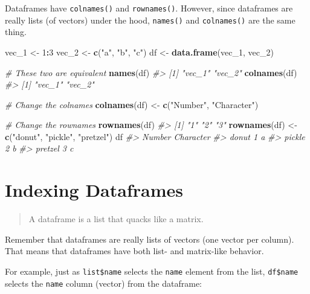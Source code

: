 \documentclass[
]{book}
\newenvironment{Shaded}{\begin{snugshade}}{\end{snugshade}}
\newcommand{\CommentTok}[1]{\textcolor[rgb]{0.56,0.35,0.01}{\textit{#1}}}
\newcommand{\DecValTok}[1]{\textcolor[rgb]{0.00,0.00,0.81}{#1}}
\newcommand{\KeywordTok}[1]{\textcolor[rgb]{0.13,0.29,0.53}{\textbf{#1}}}
\newcommand{\NormalTok}[1]{#1}
\newcommand{\OperatorTok}[1]{\textcolor[rgb]{0.81,0.36,0.00}{\textbf{#1}}}
\newcommand{\StringTok}[1]{\textcolor[rgb]{0.31,0.60,0.02}{#1}}
\begin{document}
Dataframes have \texttt{colnames()} and \texttt{rownames()}. However, since dataframes are really lists (of vectors) under the hood, \texttt{names()} and \texttt{colnames()} are the same thing.

\begin{Shaded}
\begin{Highlighting}[]
\NormalTok{vec_}\DecValTok{1}\NormalTok{ <-}\StringTok{ }\DecValTok{1}\OperatorTok{:}\DecValTok{3}
\NormalTok{vec_}\DecValTok{2}\NormalTok{ <-}\StringTok{ }\KeywordTok{c}\NormalTok{(}\StringTok{"a"}\NormalTok{, }\StringTok{"b"}\NormalTok{, }\StringTok{"c"}\NormalTok{)}
\NormalTok{df <-}\StringTok{ }\KeywordTok{data.frame}\NormalTok{(vec_}\DecValTok{1}\NormalTok{, vec_}\DecValTok{2}\NormalTok{)}

\CommentTok{# These two are equivalent}
\KeywordTok{names}\NormalTok{(df)}
\CommentTok{#> [1] "vec_1" "vec_2"}
\KeywordTok{colnames}\NormalTok{(df)}
\CommentTok{#> [1] "vec_1" "vec_2"}

\CommentTok{# Change the colnames}
\KeywordTok{colnames}\NormalTok{(df) <-}\StringTok{ }\KeywordTok{c}\NormalTok{(}\StringTok{"Number"}\NormalTok{, }\StringTok{"Character"}\NormalTok{)}

\CommentTok{# Change the rownames}
\KeywordTok{rownames}\NormalTok{(df) }
\CommentTok{#> [1] "1" "2" "3"}
\KeywordTok{rownames}\NormalTok{(df) <-}\StringTok{ }\KeywordTok{c}\NormalTok{(}\StringTok{"donut"}\NormalTok{, }\StringTok{"pickle"}\NormalTok{, }\StringTok{"pretzel"}\NormalTok{)}
\NormalTok{df}
\CommentTok{#>         Number Character}
\CommentTok{#> donut        1         a}
\CommentTok{#> pickle       2         b}
\CommentTok{#> pretzel      3         c}
\end{Highlighting}
\end{Shaded}

\hypertarget{indexing-dataframes}{%
\section{Indexing Dataframes}\label{indexing-dataframes}}

\begin{quote}
A dataframe is a list that quacks like a matrix.
\end{quote}

Remember that dataframes are really lists of vectors (one vector per column). That means that dataframes have both list- and matrix-like behavior.

For example, just as \texttt{list\$name} selects the \texttt{name} element from the list, \texttt{df\$name} selects the \texttt{name} column (vector) from the dataframe:
\end{document}
